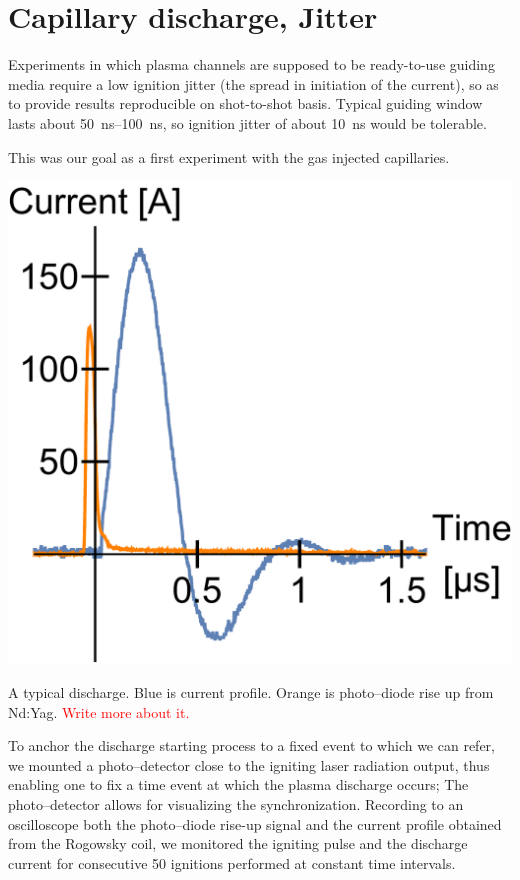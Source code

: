 \documentclass[../main.tex]{subfiles}
\begin{document}
\section{Capillary discharge, Jitter}\label{sec:jitter}
Experiments in which plasma channels are supposed to be ready-to-use guiding media require a low ignition jitter (the spread in initiation of the current), so as to provide results reproducible on shot-to-shot basis. Typical guiding window lasts about \SIrange{50}{100}{\ns}, so ignition jitter of about \SI{10}{ns} would be tolerable.

This was our goal as a first experiment with the gas injected capillaries.

\begin{marginfigure}
    \includegraphics[width=\marginparwidth]{figures/jitter/discharge_sample.pdf}
    \caption{A typical discharge. Blue is current profile. Orange is photo--diode rise up from Nd:Yag. \textcolor{red}{Write more about it.}}
    \label{fig:discharge_sample}
\end{marginfigure}
To anchor the discharge starting process to a fixed event to which we can refer, we mounted a photo--detector close to the igniting laser radiation output, thus enabling one to fix a time event at which the plasma discharge occurs; The photo--detector allows for visualizing the synchronization. Recording to an oscilloscope both the photo--diode rise-up signal and the current profile obtained from the Rogowsky coil, we monitored the igniting pulse and the discharge current for consecutive 50 ignitions performed at constant time intervals.
\end{document}
